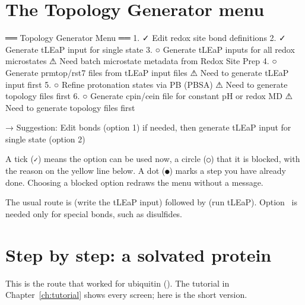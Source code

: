 \section{The Topology Generator menu}

\begin{screen}
══ Topology Generator Menu ══
  1. ✓ Edit redox site bond definitions
  2. ✓ Generate tLEaP input for single state
  3. ○ Generate tLEaP inputs for all redox microstates
       ⚠ Need batch microstate metadata from Redox Site Prep
  4. ○ Generate prmtop/rst7 files from tLEaP input files
       ⚠ Need to generate tLEaP input first
  5. ○ Refine protonation states via PB (PBSA)
       ⚠ Need to generate topology files first
  6. ○ Generate cpin/cein file for constant pH or redox MD
       ⚠ Need to generate topology files first

→ Suggestion: Edit bonds (option 1) if needed, then generate tLEaP input for
single state (option 2)
\end{screen}

A tick (\texttt{✓}) means the option can be used now, a circle (\texttt{○})
that it is blocked, with the reason on the yellow line below. A dot
(\texttt{●}) marks a step you have already done. Choosing a blocked option
redraws the menu without a message.

The usual route is  (write the tLEaP input) followed by  (run
tLEaP). Option~ is needed only for special bonds, such as disulfides.

\section{Step by step: a solvated protein}\label{sec:topology-steps}

This is the route that worked for ubiquitin (). The tutorial in
Chapter~\ref{ch:tutorial} shows every screen; here is the short version.

